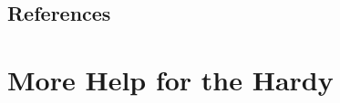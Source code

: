 \documentclass{sig-alternate-05-2015}
\begin{document}
\subsection{References}
\section{More Help for the Hardy}
\end{document}
